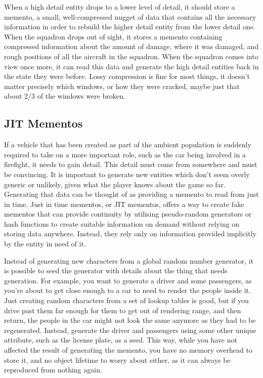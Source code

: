 \documentclass[a4paper,12pt]{article}
\begin{document}
When a high detail entity drops to a lower level of detail, it should store a memento, a small, well-compressed nugget of data that contains all the necessary information in order to rebuild the higher detail entity from the lower detail one.
When the squadron drops out of sight, it stores a memento containing compressed information about the amount of damage, where it was damaged, and rough positions of all the aircraft in the squadron.
When the squadron comes into view once more, it can read this data and generate the high detail entities back in the state they were before.
Lossy compression is fine for most things, it doesn't matter precisely which windows, or how they were cracked, maybe just that about $2/3$ of the windows were broken.

\subsection{JIT Mementos}

If a vehicle that has been created as part of the ambient population is suddenly required to take on a more important role, such as the car being involved in a firefight, it needs to gain detail.
This detail must come from somewhere and must be convincing.
It is important to generate new entities which don't seem overly generic or unlikely, given what the player knows about the game so far.
Generating that data can be thought of as providing a memento to read from just in time.
Just in time mementos, or JIT mementos, offers a way to create fake mementos that can provide continuity by utilising pseudo-random generators or hash functions to create suitable information on demand without relying on storing data anywhere.
Instead, they rely only on information provided implicitly by the entity in need of it.

Instead of generating new characters from a global random number generator, it is possible to seed the generator with details about the thing that needs generation.
For example, you want to generate a driver and some passengers, as you're about to get close enough to a car to need to render the people inside it.
Just creating random characters from a set of lookup tables is good, but if you drive past them far enough for them to get out of rendering range, and then return, the people in the car might not look the same anymore as they had to be regenerated.
Instead, generate the driver and passengers using some other unique attribute, such as the license plate, as a seed.
This way, while you have not affected the result of generating the memento, you have no memory overhead to store it, and no object lifetime to worry about either, as it can always be reproduced from nothing again.
\end{document}
